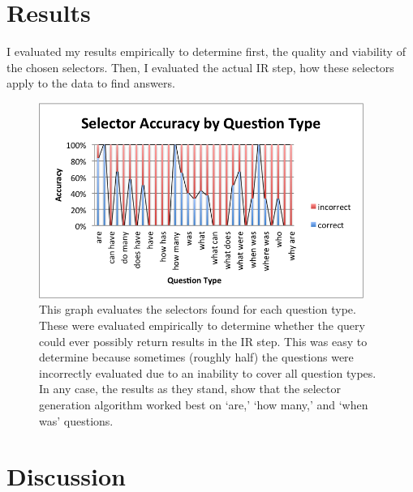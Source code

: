 \documentclass[twoside]{article}
\begin{document}

\section{Results}

I evaluated my results empirically to determine first, the quality and viability of the chosen selectors.  Then, I evaluated the actual IR step, how these selectors apply to the data to find answers.

\begin{figure}
\centering
\caption{This graph evaluates the selectors found for each question type.  These were evaluated empirically to determine whether the query could ever possibly return results in the IR step.  This was easy to determine because sometimes (roughly half) the questions were incorrectly evaluated due to an inability to cover all question types.  In any case, the results as they stand, show that the selector generation algorithm worked best on `are,' `how many,' and `when was' questions.
\label{fig:result1}}
\includegraphics[width=400px]{figures/selector-accuracy.png}
\end{figure}

\section{Discussion}

\end{document}
